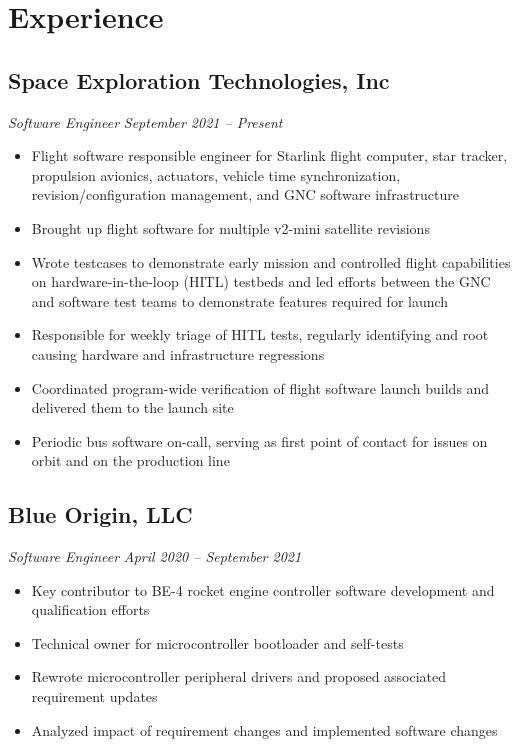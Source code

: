 \documentclass{article}
\begin{document}
\section{Experience}

\subsection{\textbf{Space Exploration Technologies, Inc}}
\raggedleft\textit{Software Engineer} \hfill \textit{September 2021 -- Present}
\begin{itemize}
    \item Flight software responsible engineer for Starlink flight computer, star tracker, propulsion avionics, actuators, vehicle time synchronization, revision/configuration management, and GNC software infrastructure
    \item Brought up flight software for multiple v2-mini satellite revisions
    \item Wrote testcases to demonstrate early mission and controlled flight capabilities on hardware-in-the-loop (HITL) testbeds and led efforts between the GNC and software test teams to demonstrate features required for launch
    \item Responsible for weekly triage of HITL tests, regularly identifying and root causing hardware and infrastructure regressions
    \item Coordinated program-wide verification of flight software launch builds and delivered them to the launch site
    \item Periodic bus software on-call, serving as first point of contact for issues on orbit and on the production line
\end{itemize}

\bigskip

\subsection{\textbf{Blue Origin, LLC}}
\raggedleft\textit{Software Engineer} \hfill \textit{April 2020 -- September 2021}
\begin{itemize}
    \item Key contributor to BE-4 rocket engine controller software development and qualification efforts
    \item Technical owner for microcontroller bootloader and self-tests
    \item Rewrote microcontroller peripheral drivers and proposed associated requirement updates
    \item Analyzed impact of requirement changes and implemented software changes
\end{itemize}
\end{document}
